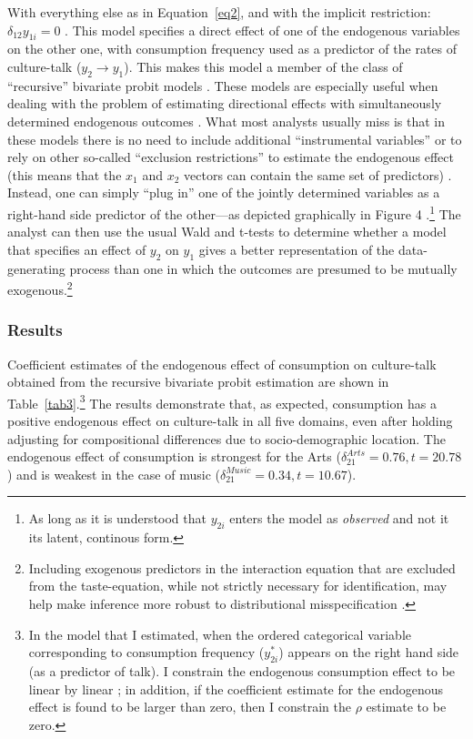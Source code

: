 \documentclass[11pt]{article}
\begin{document}
With everything else as in Equation~\ref{eq2}, and with the implicit restriction: $\delta_{12}y_{1i}=0$ \citep{simon54}.  This model specifies a direct effect of one of the endogenous variables on the other one, with consumption frequency used as a predictor of the rates of culture-talk ($y_{2} \rightarrow y_{1}$).  This makes this model a member of the class of ``recursive'' bivariate probit models \citep{monfardini_radice08}.   These models are especially useful when dealing with the problem of estimating directional effects with simultaneously determined endogenous outcomes \citep{greene98}.  What most analysts usually miss is that in these models there is no need to include additional ``instrumental variables'' or to rely on other so-called ``exclusion restrictions'' to estimate the endogenous effect (this means that the $x_{1}$ and $x_{2}$ vectors can contain the same set of predictors) \citep{monfardini_radice08}.  Instead, one can simply ``plug in'' one of the jointly determined variables as a right-hand side predictor of the other---as depicted graphically in Figure 4 \citep{greene98}.\footnote{As long as it is understood that  $y_{2i}$ enters the model as \emph{observed} and not it its latent, continous form.} The analyst can then use the usual Wald and t-tests to determine whether a model that specifies an effect of $y_{2}$ on $y_{1}$ gives a better representation of the data-generating process than one in which the outcomes are presumed to be mutually exogenous.\footnote{Including exogenous predictors in the interaction equation that are excluded from the taste-equation, while not strictly necessary for identification, may help make inference more robust to distributional misspecification \citep{monfardini_radice08}.}

\subsubsection{Results}
Coefficient estimates of the endogenous effect of consumption on culture-talk obtained from the recursive bivariate probit estimation are shown in Table~\ref{tab3}.\footnote{In the model that I estimated, when the ordered categorical variable corresponding to consumption frequency ($y^{*}_{2i}$) appears on the right hand side (as a predictor of talk). I constrain the endogenous consumption effect to be linear by linear \citep[370]{agresti02}; in addition, if the coefficient estimate for the endogenous effect is found to be larger than zero, then I constrain the $\rho$ estimate to be zero.}  The results demonstrate that, as expected, consumption has a positive endogenous effect on culture-talk in all five domains, even after holding adjusting for compositional differences due to socio-demographic location.  The endogenous effect of consumption is strongest for the Arts ($\delta_{21}^{Arts}=0.76, t=20.78$) and is weakest in the case of music ($\delta_{21}^{Music}=0.34, t=10.67$).   
\end{document}
